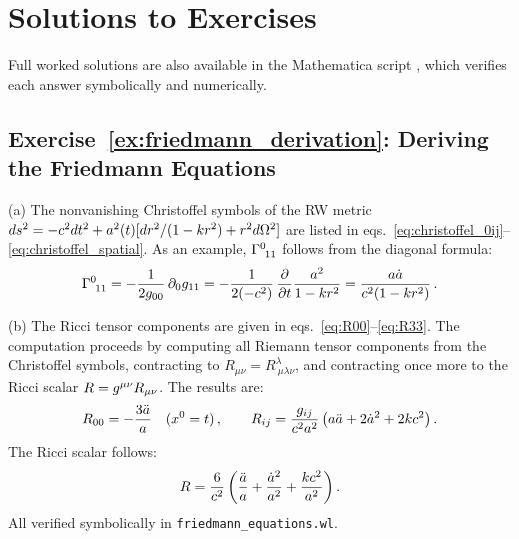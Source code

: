 
\section{Solutions to Exercises}
\label{sec:cosmo_solutions}

\noindent
Full worked solutions are also available in the Mathematica script
,
which verifies each answer symbolically and numerically.

\subsection*{Exercise~\ref{ex:friedmann_derivation}: Deriving the Friedmann Equations}

(a) The nonvanishing Christoffel symbols of the RW metric
$ds^2 = -c^2 dt^2 + a^2(t)[dr^2/(1-kr^2) + r^2 d\Omega^2]$
are listed in eqs.~\eqref{eq:christoffel_0ij}--\eqref{eq:christoffel_spatial}.
As an example, $\Gamma^{0}_{\ 1 1}$ follows from the diagonal formula:
\[
    \Gamma^{0}_{\ 1 1} = -\frac{1}{2g_{00}}\, \partial_0 g_{11}
    = -\frac{1}{2(-c^2)}\, \frac{\partial}{\partial t}
    \frac{a^2}{1-kr^2}
    = \frac{a\dot{a}}{c^2(1-kr^2)} \,.
\]

(b) The Ricci tensor components are given in
eqs.~\eqref{eq:R00}--\eqref{eq:R33}.  The computation proceeds by
computing all Riemann tensor components from the Christoffel symbols,
contracting to $R_{\mu\nu} = R^\lambda_{\ \mu\lambda\nu}$, and
contracting once more to the Ricci scalar
$R = g^{\mu\nu} R_{\mu\nu}$.  The results are:
\[
    R_{00} = -\frac{3\ddot{a}}{a} \quad (x^0 = t) \,, \qquad
    R_{ij} = \frac{g_{ij}}{c^2 a^2}
    \left(a\ddot{a} + 2\dot{a}^2 + 2kc^2\right) .
\]
The Ricci scalar follows:
\[
    R = \frac{6}{c^2}
    \left(\frac{\ddot{a}}{a} + \frac{\dot{a}^2}{a^2}
    + \frac{kc^2}{a^2}\right) .
\]
All verified symbolically in \texttt{friedmann\_equations.wl}.


